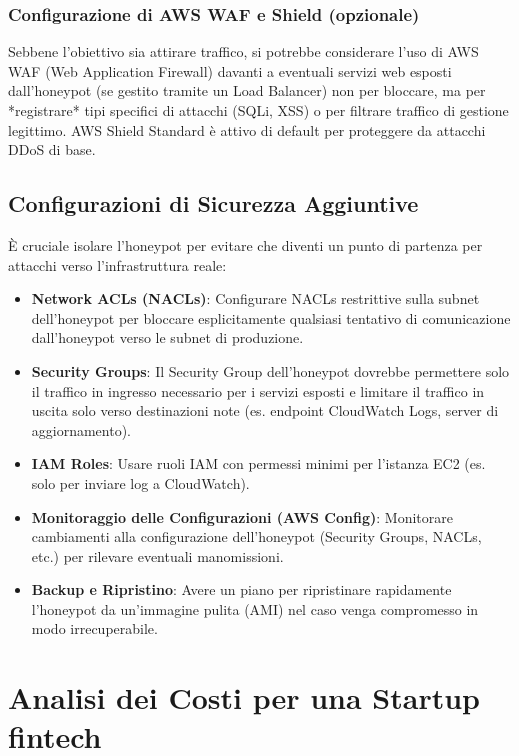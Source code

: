 \subsubsection{Configurazione di AWS WAF e Shield (opzionale)}
\label{subsubsec:config_waf}

Sebbene l'obiettivo sia attirare traffico, si potrebbe considerare l'uso di AWS WAF (Web Application Firewall) davanti a eventuali servizi web esposti dall'honeypot (se gestito tramite un Load Balancer) non per bloccare, ma per *registrare* tipi specifici di attacchi (SQLi, XSS) o per filtrare traffico di gestione legittimo. AWS Shield Standard è attivo di default per proteggere da attacchi DDoS di base.

\subsection{Configurazioni di Sicurezza Aggiuntive}
\label{subsec:sicurezza_aggiuntiva}

È cruciale isolare l'honeypot per evitare che diventi un punto di partenza per attacchi verso l'infrastruttura reale:

\begin{itemize}
    \item \textbf{Network ACLs (NACLs)}: Configurare NACLs restrittive sulla subnet dell'honeypot per bloccare esplicitamente qualsiasi tentativo di comunicazione dall'honeypot verso le subnet di produzione.
    \item \textbf{Security Groups}: Il Security Group dell'honeypot dovrebbe permettere solo il traffico in ingresso necessario per i servizi esposti e limitare il traffico in uscita solo verso destinazioni note (es. endpoint CloudWatch Logs, server di aggiornamento).
    \item \textbf{IAM Roles}: Usare ruoli IAM con permessi minimi per l'istanza EC2 (es. solo per inviare log a CloudWatch).
    \item \textbf{Monitoraggio delle Configurazioni (AWS Config)}: Monitorare cambiamenti alla configurazione dell'honeypot (Security Groups, NACLs, etc.) per rilevare eventuali manomissioni.
    \item \textbf{Backup e Ripristino}: Avere un piano per ripristinare rapidamente l'honeypot da un'immagine pulita (AMI) nel caso venga compromesso in modo irrecuperabile.
\end{itemize}

\section{Analisi dei Costi per una Startup fintech}
\label{sec:analisi_costi}

